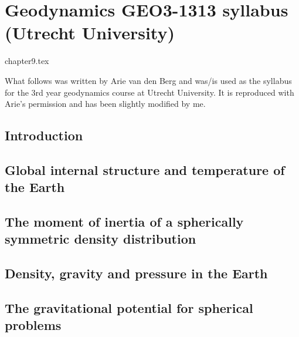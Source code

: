 \chapter{Geodynamics GEO3-1313 syllabus (Utrecht University)} %

\begin{flushright} {\tiny {\color{gray} chapter9.tex}} \end{flushright}


What follows was written by Arie van den Berg and was/is used as the syllabus for the 
3rd year geodynamics course at Utrecht University. It is reproduced with Arie's permission
and has been slightly modified by me.

\section{Introduction} 
 

\section{Global internal structure and temperature of the Earth} 
 

\section{The moment of inertia of a spherically symmetric density distribution} 
\label{sect_scalarmomint}  

\newpage
\section{Density, gravity and pressure in the Earth} 
\label{section_Density-gravity-pressure}  

\section{The gravitational potential for spherical problems}
  

